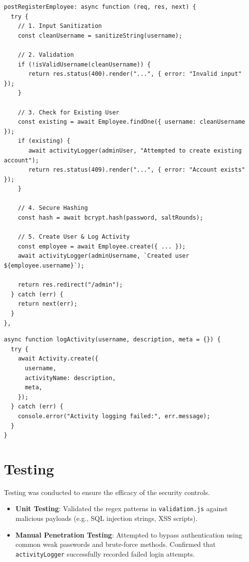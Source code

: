 \documentclass[11pt]{article}
\begin{document}
\begin{lstlisting}[caption={Secure Employee Registration with Hashing and Logging}]
postRegisterEmployee: async function (req, res, next) {
  try {
    // 1. Input Sanitization
    const cleanUsername = sanitizeString(username);
    
    // 2. Validation
    if (!isValidUsername(cleanUsername)) {
       return res.status(400).render("...", { error: "Invalid input" });
    }

    // 3. Check for Existing User
    const existing = await Employee.findOne({ username: cleanUsername });
    if (existing) {
       await activityLogger(adminUser, "Attempted to create existing account");
       return res.status(409).render("...", { error: "Account exists" });
    }

    // 4. Secure Hashing
    const hash = await bcrypt.hash(password, saltRounds);
    
    // 5. Create User & Log Activity
    const employee = await Employee.create({ ... });
    await activityLogger(adminUsername, `Created user ${employee.username}`);
    
    return res.redirect("/admin");
  } catch (err) {
    return next(err);
  }
},
\end{lstlisting}

\begin{lstlisting}[caption={Centralized Activity Logger}]
async function logActivity(username, description, meta = {}) {
  try {
    await Activity.create({
      username,
      activityName: description,
      meta,
    });
  } catch (err) {
    console.error("Activity logging failed:", err.message);
  }
}
\end{lstlisting}

\section{Testing}
Testing was conducted to ensure the efficacy of the security controls.
\begin{itemize}
    \item \textbf{Unit Testing}: Validated the regex patterns in \texttt{validation.js} against malicious payloads (e.g., SQL injection strings, XSS scripts).
    \item \textbf{Manual Penetration Testing}: Attempted to bypass authentication using common weak passwords and brute-force methods. Confirmed that \texttt{activityLogger} successfully recorded failed login attempts.
\end{itemize}
\end{document}
